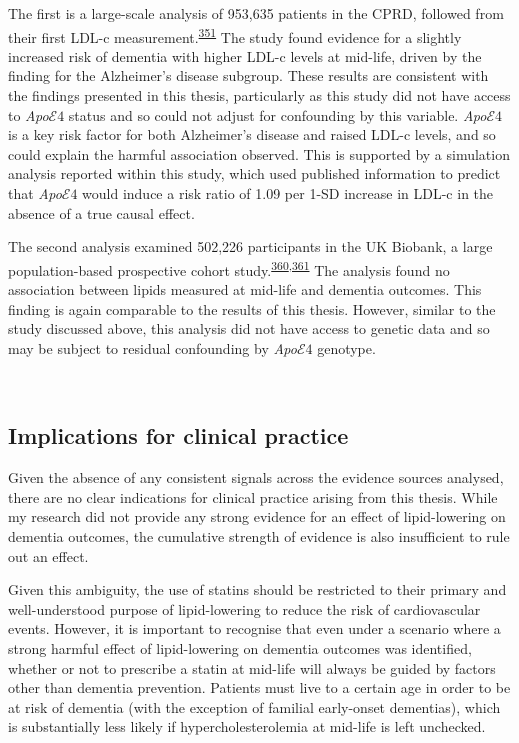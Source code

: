 \documentclass[a4paper, twoside]{templates/ociamthesis}
\begin{document}
The first is a large-scale analysis of 953,635 patients in the CPRD, followed from their first LDL-c measurement.\textsuperscript{\protect\hyperlink{ref-iwagami2021}{351}} The study found evidence for a slightly increased risk of dementia with higher LDL-c levels at mid-life, driven by the finding for the Alzheimer's disease subgroup. These results are consistent with the findings presented in this thesis, particularly as this study did not have access to \emph{Apo}\(\mathcal{E}4\) status and so could not adjust for confounding by this variable. \emph{Apo}\(\mathcal{E}4\) is a key risk factor for both Alzheimer's disease and raised LDL-c levels, and so could explain the harmful association observed. This is supported by a simulation analysis reported within this study, which used published information to predict that \emph{Apo}\(\mathcal{E}4\) would induce a risk ratio of 1.09 per 1-SD increase in LDL-c in the absence of a true causal effect.

The second analysis examined 502,226 participants in the UK Biobank, a large population-based prospective cohort study.\textsuperscript{\protect\hyperlink{ref-gong2021}{360},\protect\hyperlink{ref-sudlow2015}{361}} The analysis found no association between lipids measured at mid-life and dementia outcomes. This finding is again comparable to the results of this thesis. However, similar to the study discussed above, this analysis did not have access to genetic data and so may be subject to residual confounding by \emph{Apo}\(\mathcal{E}4\) genotype.

~

\hypertarget{implications-for-clinical-practice}{%
\subsection{Implications for clinical practice}\label{implications-for-clinical-practice}}

Given the absence of any consistent signals across the evidence sources analysed, there are no clear indications for clinical practice arising from this thesis. While my research did not provide any strong evidence for an effect of lipid-lowering on dementia outcomes, the cumulative strength of evidence is also insufficient to rule out an effect.

Given this ambiguity, the use of statins should be restricted to their primary and well-understood purpose of lipid-lowering to reduce the risk of cardiovascular events. However, it is important to recognise that even under a scenario where a strong harmful effect of lipid-lowering on dementia outcomes was identified, whether or not to prescribe a statin at mid-life will always be guided by factors other than dementia prevention. Patients must live to a certain age in order to be at risk of dementia (with the exception of familial early-onset dementias), which is substantially less likely if hypercholesterolemia at mid-life is left unchecked.
\end{document}
